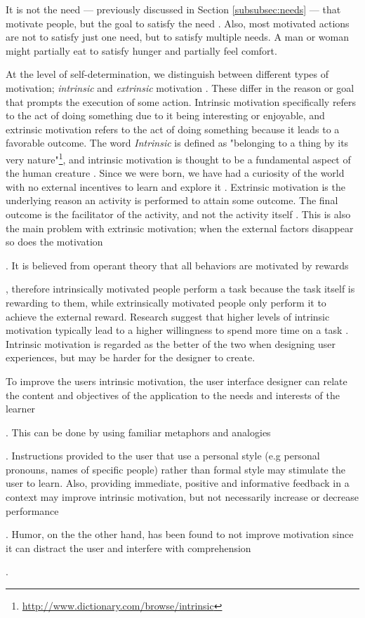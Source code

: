 It is not the need --- previously discussed in Section \ref{subsubsec:needs} --- that motivate people, but the goal to satisfy the need \cite{Maslow1943}. Also, most motivated actions are not to satisfy just one need, but to satisfy multiple needs. A man or woman might partially eat to satisfy hunger and partially feel comfort.

At the level of self-determination, we distinguish between different types of motivation; \textit{intrinsic} and \textit{extrinsic} motivation \cite{Ryan2000a}. These differ in the reason or goal that prompts the execution of some action. Intrinsic motivation specifically refers to the act of doing something due to it being interesting or enjoyable, and extrinsic motivation refers to the act of doing something because it leads to a favorable outcome. The word \textit{Intrinsic} is defined as "belonging to a thing by its very nature"\footnote{\url{http://www.dictionary.com/browse/intrinsic}}, and intrinsic motivation is thought to be a fundamental aspect of the human creature \cite{White1959}. Since we were born, we have had a curiosity of the world with no external incentives to learn and explore it \cite{Ryan2000a}. Extrinsic motivation is the underlying reason an activity is performed to attain some outcome. The final outcome is the facilitator of the activity, and not the activity itself \cite{Ryan2000a}. This is also the main problem with extrinsic motivation; when the external factors disappear so does the motivation. It is believed from operant theory that all behaviors are motivated by rewards, therefore intrinsically motivated people perform a task because the task itself is rewarding to them, while extrinsically motivated people only perform it to achieve the external reward. Research suggest that higher levels of intrinsic motivation typically lead to a higher willingness to spend more time on a task \cite{Deci1975}. Intrinsic motivation is regarded as the better of the two when designing user experiences, but may be harder for the designer to create.

To improve the users intrinsic motivation, the user interface designer can relate the content and objectives of the application to the needs and interests of the learner . This can be done by using familiar metaphors and analogies . Instructions provided to the user that use a personal style (e.g personal pronouns, names of specific people) rather than formal style may stimulate the user to learn. Also, providing immediate, positive and informative feedback in a context may improve intrinsic motivation, but not necessarily increase or decrease performance . Humor, on the the other hand, has been found to not improve motivation since it can distract the user and interfere with comprehension .

